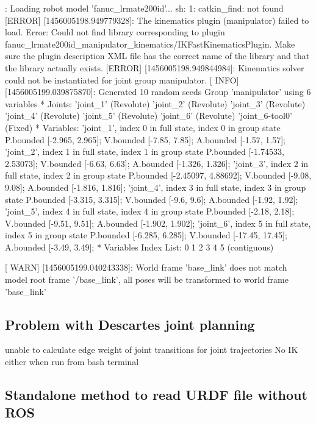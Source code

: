 \begin{DoxyVerb}[ INFO] [1456005198.420170539]: Loading robot model 'fanuc_lrmate200id'...
sh: 1: catkin_find: not found
[ERROR] [1456005198.949779328]: The kinematics plugin (manipulator) failed to load. Error: Could not find library corresponding to plugin fanuc_lrmate200id_manipulator_kinematics/IKFastKinematicsPlugin. Make sure the plugin description XML file has the correct name of the library and that the library actually exists.
[ERROR] [1456005198.949844984]: Kinematics solver could not be instantiated for joint group manipulator.
[ INFO] [1456005199.039875870]: Generated 10 random seeds
Group 'manipulator' using 6 variables
  * Joints:
    'joint_1' (Revolute)
    'joint_2' (Revolute)
    'joint_3' (Revolute)
    'joint_4' (Revolute)
    'joint_5' (Revolute)
    'joint_6' (Revolute)
    'joint_6-tool0' (Fixed)
  * Variables:
    'joint_1', index 0 in full state, index 0 in group state
        P.bounded [-2.965, 2.965]; V.bounded [-7.85, 7.85]; A.bounded [-1.57, 1.57];
    'joint_2', index 1 in full state, index 1 in group state
        P.bounded [-1.74533, 2.53073]; V.bounded [-6.63, 6.63]; A.bounded [-1.326, 1.326];
    'joint_3', index 2 in full state, index 2 in group state
        P.bounded [-2.45097, 4.88692]; V.bounded [-9.08, 9.08]; A.bounded [-1.816, 1.816];
    'joint_4', index 3 in full state, index 3 in group state
        P.bounded [-3.315, 3.315]; V.bounded [-9.6, 9.6]; A.bounded [-1.92, 1.92];
    'joint_5', index 4 in full state, index 4 in group state
        P.bounded [-2.18, 2.18]; V.bounded [-9.51, 9.51]; A.bounded [-1.902, 1.902];
    'joint_6', index 5 in full state, index 5 in group state
        P.bounded [-6.285, 6.285]; V.bounded [-17.45, 17.45]; A.bounded [-3.49, 3.49];
  * Variables Index List:
    0 1 2 3 4 5 (contiguous)

[ WARN] [1456005199.040243338]: World frame 'base_link' does not match model root frame '/base_link', all poses will be transformed to world frame 'base_link'
\end{DoxyVerb}


\subsection*{Problem with Descartes joint planning }

unable to calculate edge weight of joint transitions for joint trajectories No I\-K either when run from bash terminal

\subsection*{Standalone method to read U\-R\-D\-F file without R\-O\-S }

